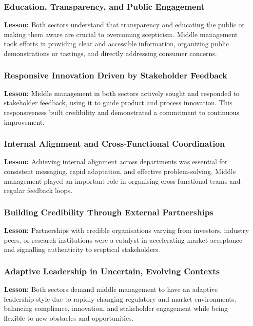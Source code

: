 \subsubsection{Education, Transparency, and Public Engagement}
\noindent\textbf{Lesson:} Both sectors understand that transparency and educating the public or making them aware are crucial to overcoming scepticism. Middle management took efforts in providing clear and accessible information, organizing public demonstrations or tastings, and directly addressing consumer concerns.

\subsubsection{Responsive Innovation Driven by Stakeholder Feedback}
\noindent\textbf{Lesson:} Middle management in both sectors actively sought and responded to stakeholder feedback, using it to guide product and process innovation. This responsiveness built credibility and demonstrated a commitment to continuous improvement.

\subsubsection{Internal Alignment and Cross-Functional Coordination}
\noindent\textbf{Lesson:} Achieving internal alignment across departments was essential for consistent messaging, rapid adaptation, and effective problem-solving. Middle management played an important role in organising cross-functional teams and regular feedback loops.

\subsubsection{Building Credibility Through External Partnerships}
\noindent\textbf{Lesson:} Partnerships with credible organisations varying from investors, industry peers, or research institutions were a catalyst in accelerating market acceptance and signalling authenticity to sceptical stakeholders.

\subsubsection{Adaptive Leadership in Uncertain, Evolving Contexts}
\noindent\textbf{Lesson:} Both sectors demand middle management to have an adaptive leadership style due to rapidly changing regulatory and market environments, balancing compliance, innovation, and stakeholder engagement while being flexible to new obstacles and opportunities.

